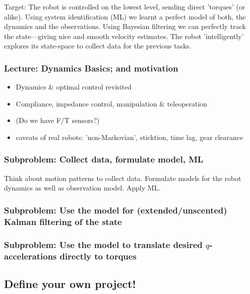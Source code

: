 \documentclass[10pt,fleqn,twoside]{article}
\begin{document}
Target: The robot is controlled on the lowest level, sending direct
'torques' (or alike). Using system identification (ML) we learnt a
perfect model of both, the dynamics and the observations. Using
Bayesian filtering we can perfectly track the state---giving nice and
smooth velocity estimates. The robot 'intelligently' explores its
state-space to collect data for the previous tasks.

\subsubsection{Lecture: Dynamics Basics; and motivation}

\begin{itemize}
\item Dynamics \& optimal control revisited
\item Compliance, impedance control, manipulation \& teleoperation
\item (Do we have F/T sensors?)
\item caveats of real robots: 'non-Markovian', sticktion, time lag,
  gear clearance
\end{itemize}

\subsubsection{Subproblem: Collect data, formulate model, ML}

Think about motion patterns to collect data. Formulate models for the
robot dynamics as well as observation model. Apply ML.

\subsubsection{Subproblem: Use the model for (extended/unscented)
  Kalman filtering of the state}


\subsubsection{Subproblem: Use the model to translate desired
  $q$-accelerations directly to torques}



\subsection{Define your own project!}
\end{document}
